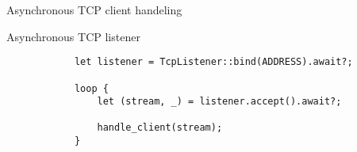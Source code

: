 \begin{frame}[fragile]{Asynchronous TCP client handeling}
    \begin{block}{Asynchronous TCP listener}
        \begin{verbatim}
            let listener = TcpListener::bind(ADDRESS).await?;

            loop {
                let (stream, _) = listener.accept().await?;

                handle_client(stream);
            }
        \end{verbatim}
    \end{block}
\end{frame}

